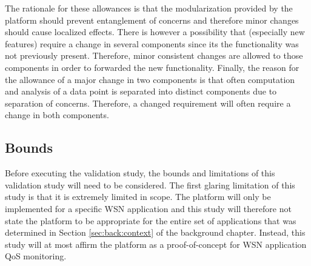 The rationale for these allowances is that the modularization provided by the platform should prevent entanglement of concerns and therefore minor changes should cause localized effects. There is however a possibility that (especially new features) require a change in several components since its the functionality was not previously present. Therefore, minor consistent changes are allowed to those components in order to forwarded the new functionality. Finally, the reason for the allowance of a major change in two components is that often computation and analysis of a data point is separated into distinct components due to separation of concerns. Therefore, a changed requirement will often require a change in both components.


\subsection{Bounds}
Before executing the validation study, the bounds and limitations of this validation study will need to be considered. The first glaring limitation of this study is that it is extremely limited in scope. The platform will only be implemented for a specific WSN application and this study will therefore not state the platform to be appropriate for the entire set of applications that was determined in Section \ref{sec:back:context} of the background chapter. Instead, this study will at most affirm the platform as a proof-of-concept for WSN application QoS monitoring.

